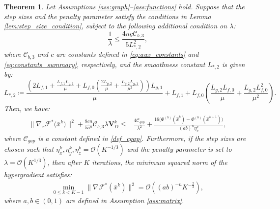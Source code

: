 \documentclass{article}
\theoremstyle{plain}
\newtheorem{theorem}{Theorem}[section]
\theoremstyle{definition}
\theoremstyle{remark}
\begin{document}
\begin{theorem}\label{thm:fab_app}
Let Assumptions \ref{ass:graph}--\ref{ass:functions} hold. Suppose that the step sizes and the penalty parameter satisfy the conditions in Lemma \ref{lem:step_size_condition}, subject to the following additional condition on $\lambda$:
\begin{equation}
    \frac{1}{\lambda} \leq \frac{4 n\underline{c}\mathcal{C}_{b,3}}{5 L_{*,2}^{2}},
\end{equation}
where $\mathcal{C}_{b,3}$ and $\underline{c}$ are constants defined in \eqref{eq:aux_constants} and \eqref{eq:constants_summary}, respectively, and the smoothness constant $L_{*,2}$ is given by:
\begin{equation*}
    L_{*,2} \coloneqq \frac{\left(2 L_{f,1} + \frac{L_{f,1}L_{g,1}}{\mu} + L_{f,0}\left(\frac{2L_{g,2}}{\mu} + \frac{L_{g,2}L_{g,1}}{\mu^2}\right)\right)L_{g,1}}{\mu} + L_{f,1} + L_{f,0}\left(\frac{L_{g,2}L_{f,0}}{\mu}+\frac{L_{g,2}L_{f,0}^{2}}{\mu^{2}}\right).
\end{equation*}
Then, we have:
\begin{align}\label{eq:descent_inequality_both}
    \big\|\nabla_{x} \mathcal{F}^{*}\big({\bar{x}}^k\big) \big\|^{2} +\frac{8\underline{c} n}{5 a^n}\mathcal{C}_{b,3}\lambda  \mathbf{V}_{D}^{k}
    \leq{}& \frac{4\mathcal{C}_{gap}}{\lambda^{2}} + \frac{16\big(\Phi^{(b)}({\hat{x}}^{k}) - \Phi^{(b)}({\hat{x}}^{k+1}) \big)}{(ab)^{n}\eta_{x}^{k}} ,
\end{align}
where $\mathcal{C}_{gap}$ is a constant defined in \eqref{def_cgap}.
   Furthermore, if the step sizes are chosen such that $\eta_{x}^k, \eta_{y}^k, \eta_{z}^k = \mathcal{O}(K^{-1/3})$ and the penalty parameter is set to $\lambda = \mathcal{O}(K^{1/3})$, then after $K$ iterations, the minimum squared norm of the hypergradient satisfies:
    \begin{align}
        \min_{0 \le k < K-1} \|\nabla \mathcal{F}^*(\bar{x}^k)\|^2 = \mathcal{O}\left( (ab)^{-n} K^{-\frac{2}{3}} \right),
    \end{align}
    where $a, b \in (0, 1)$ are defined in Assumption \ref{ass:matrix}.
\end{theorem}
\end{document}
